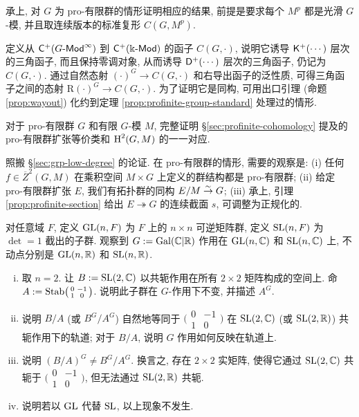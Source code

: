 \begin{Exercises}
	\item 承上, 对 $G$ 为 pro-有限群的情形证明相应的结果, 前提是要求每个 $M^p$ 都是光滑 $G$-模, 并且取连续版本的标准复形 $C(G, M^p)$.
	
	\begin{hint}
		定义从 $\mathsf{C}^+(G\text{-}\mathsf{Mod}^\infty)$ 到 $\mathsf{C}^+(\Bbbk\text{-}\mathsf{Mod})$ 的函子 $C(G, \cdot)$, 说明它诱导 $\mathsf{K}^+(\cdots)$ 层次的三角函子, 而且保持零调对象, 从而诱导 $\mathsf{D}^+(\cdots)$ 层次的三角函子, 仍记为 $C(G, \cdot)$. 通过自然态射 $(\cdot)^G \to C(G, \cdot)$ 和右导出函子的泛性质, 可得三角函子之间的态射 $\mathrm{R}(\cdot)^G \to C(G, \cdot)$. 为了证明它是同构, 可用出口引理 (命题 \ref{prop:wayout}) 化约到定理 \ref{prop:profinite-group-standard} 处理过的情形.
	\end{hint}

	\item 对于 pro-有限群 $G$ 和有限 $G$-模 $M$, 完整证明 \S\ref{sec:profinite-cohomology} 提及的 pro-有限群扩张等价类和 $\operatorname{H}^2(G, M)$ 的一一对应.
	
	\begin{hint}
		照搬 \S\ref{sec:grp-low-degree} 的论证. 在 pro-有限群的情形, 需要的观察是: (i) 任何 $f \in \overline{Z}^2(G, M)$ 在乘积空间 $M \times G$ 上定义的群结构都是 pro-有限群; (ii) 给定 pro-有限群扩张 $E$, 我们有拓扑群的同构 $E/M \stackrel{\sim}{\rightarrow} G$; (iii) 承上, 引理 \ref{prop:profinite-section} 给出 $E \twoheadrightarrow G$ 的连续截面 $s$, 可调整为正规化的.
	\end{hint}

	\item 对任意域 $F$, 定义 $\operatorname{GL}(n, F)$ 为 $F$ 上的 $n \times n$ 可逆矩阵群, 定义 $\operatorname{SL}(n, F)$ 为 $\det = 1$ 截出的子群. 观察到 $G := \operatorname{Gal}(\mathbb{C}|\mathbb{R})$ 作用在 $\operatorname{GL}(n, \mathbb{C})$ 和 $\operatorname{SL}(n, \mathbb{C})$ 上, 不动点分别是 $\operatorname{GL}(n, \mathbb{R})$ 和 $\operatorname{SL}(n, \mathbb{R})$.
	\begin{enumerate}[(i)]
		\item 取 $n=2$. 让 $B := \operatorname{SL}(2, \mathbb{C})$ 以共轭作用在所有 $2 \times 2$ 矩阵构成的空间上. 命 $A := \operatorname{Stab}\bigl(\begin{smallmatrix} 0 & -1 \\ 1 & 0 \end{smallmatrix}\bigr)$. 说明此子群在 $G$-作用下不变, 并描述 $A^G$.
		\item 说明 $B/A$ (或 $B^G/A^G$) 自然地等同于 $\bigl(\begin{smallmatrix} 0 & -1 \\ 1 & 0 \end{smallmatrix}\bigr)$ 在 $\operatorname{SL}(2, \mathbb{C})$ (或 $\operatorname{SL}(2, \mathbb{R})$) 共轭作用下的轨道; 对于 $B/A$, 说明 $G$ 作用如何反映在轨道上.
		\item 说明 $(B/A)^G \neq B^G/A^G$. 换言之, 存在 $2 \times 2$ 实矩阵, 使得它通过 $\operatorname{SL}(2, \mathbb{C})$ 共轭于 $\bigl(\begin{smallmatrix} 0 & -1 \\ 1 & 0 \end{smallmatrix}\bigr)$, 但无法通过 $\operatorname{SL}(2, \mathbb{R})$ 共轭.
		\item 说明若以 $\operatorname{GL}$ 代替 $\operatorname{SL}$, 以上现象不发生.
	\end{enumerate}


\end{Exercises}
